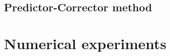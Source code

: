 \documentclass[11pt]{article}	%
\begin{document}
\subsection{Predictor-Corrector method}

\section{Numerical experiments}

\end{document}
